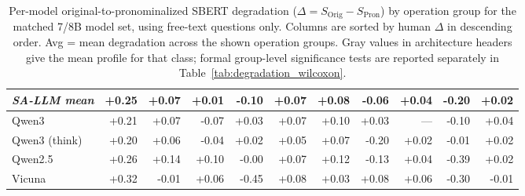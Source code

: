 \begin{table}[h]
\begin{tabular}{>{\raggedright\arraybackslash}p{2.1cm}rrrrrrrrrr}
\rowcolor{gray!12}\textit{SA-LLM mean} & +0.25 & +0.07 & +0.01 & -0.10 & +0.07 & +0.08 & -0.06 & +0.04 & -0.20 & +0.02 \\
\midrule
Qwen3 & +0.21 & +0.07 & -0.07 & +0.03 & +0.07 & +0.10 & +0.03 & --- & -0.10 & +0.04 \\
Qwen3 (think) & +0.20 & +0.06 & -0.04 & +0.02 & +0.05 & +0.07 & -0.20 & +0.02 & -0.01 & +0.02 \\
Qwen2.5 & +0.26 & +0.14 & +0.10 & -0.00 & +0.07 & +0.12 & -0.13 & +0.04 & -0.39 & +0.02 \\
Vicuna & +0.32 & -0.01 & +0.06 & -0.45 & +0.08 & +0.03 & +0.08 & +0.06 & -0.30 & -0.01 \\
\bottomrule
\end{tabular}
\caption{Per-model original-to-pronominalized SBERT degradation ($\Delta = S_\mathrm{Orig} - S_\mathrm{Pron}$) by operation group for the matched 7/8B model set, using free-text questions only. Columns are sorted by human $\Delta$ in descending order. Avg = mean degradation across the shown operation groups. Gray values in architecture headers give the mean profile for that class; formal group-level significance tests are reported separately in Table~\ref{tab:degradation_wilcoxon}.}
\label{tab:op_degradation_per_model}
\end{table}
